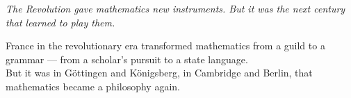 \documentclass[9pt]{article}
\begin{document}
\begin{center}
  \textit{The Revolution gave mathematics new instruments. But it was the next century that learned to play them.}
\end{center}

\vspace{1em}

\noindent
France in the revolutionary era transformed mathematics from a guild to a grammar — from a scholar’s pursuit to a state language. \\

\noindent
But it was in Göttingen and Königsberg, in Cambridge and Berlin, that mathematics became a philosophy again.
\end{document}
